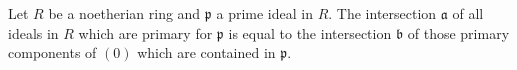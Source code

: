 Let $R$ be a noetherian ring and $\mathfrak{p}$ a prime ideal in $R$. The intersection $\mathfrak{a}$ of all ideals in $R$ which are primary for $\mathfrak{p}$ is equal to the intersection $\mathfrak{b}$ of those primary components of $(0)$ which are contained in $\mathfrak{p}$.
